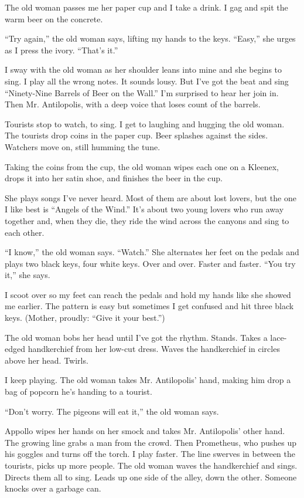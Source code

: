 \documentclass[twoside,10pt]{book}
\begin{document}
The old woman passes me her paper cup and I take a drink. I gag and spit
the warm beer on the concrete.

``Try again,'' the old woman says, lifting my hands to the keys.
``Easy,'' she urges as I press the ivory. ``That's it.''

I sway with the old woman as her shoulder leans into mine and she begins
to sing. I play all the wrong notes. It sounds lousy. But I've got the
beat and sing ``Ninety-Nine Barrels of Beer on the Wall.'' I'm surprised
to hear her join in. Then Mr. Antilopolis, with a deep voice that loses
count of the barrels.

Tourists stop to watch, to sing. I get to laughing and hugging the old
woman. The tourists drop coins in the paper cup. Beer splashes against
the sides. Watchers move on, still humming the tune.

Taking the coins from the cup, the old woman wipes each one on a
Kleenex, drops it into her satin shoe, and finishes the beer in the cup.

She plays songs I've never heard. Most of them are about lost lovers,
but the one I like best is ``Angels of the Wind.'' It's about two young
lovers who run away together and, when they die, they ride the wind
across the canyons and sing to each other.

``I know,'' the old woman says. ``Watch.'' She alternates her feet on
the pedals and plays two black keys, four white keys. Over and over.
Faster and faster. ``You try it,'' she says.

I scoot over so my feet can reach the pedals and hold my hands like she
showed me earlier. The pattern is easy but sometimes I get confused and
hit three black keys. (Mother, proudly: ``Give it your best.'')

The old woman bobs her head until I've got the rhythm. Stands. Takes a
lace-edged hand­kerchief from her low-cut dress. Waves the handkerchief
in circles above her head. Twirls.

I keep playing. The old woman takes Mr. Antilopolis' hand, making him
drop a bag of pop­corn he's handing to a tourist.

``Don't worry. The pigeons will eat it,'' the old woman says.

Appollo wipes her hands on her smock and takes Mr. Antilopolis' other
hand. The growing line grabs a man from the crowd. Then Prometheus, who
pushes up his goggles and turns off the torch. I play faster. The line
swerves in between the tourists, picks up more people. The old woman
waves the handkerchief and sings. Directs them all to sing. Leads up one
side of the alley, down the other. Someone knocks over a garbage can.
\end{document}
